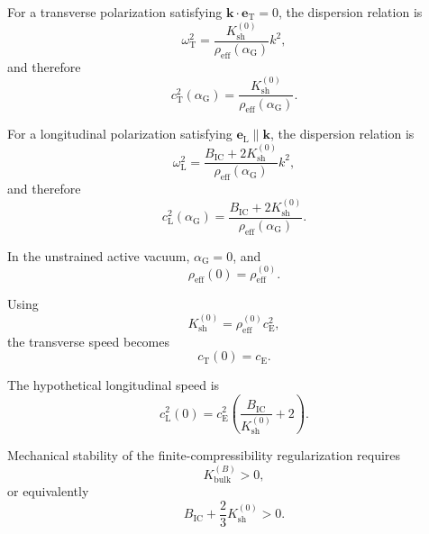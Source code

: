 For a transverse polarization satisfying $\mathbf{k}\cdot\mathbf{e}_{\mathrm{T}}=0$, the dispersion relation is
\begin{equation}
    \omega_{\mathrm{T}}^2 = \frac{K_{\mathrm{sh}}^{(0)}}{\rho_{\mathrm{eff}}(\alpha_{\mathrm{G}})}k^2,
\end{equation}
and therefore
\begin{equation}
    c_{\mathrm{T}}^2(\alpha_{\mathrm{G}}) = \frac{K_{\mathrm{sh}}^{(0)}}{\rho_{\mathrm{eff}}(\alpha_{\mathrm{G}})}.
\end{equation}

For a longitudinal polarization satisfying $\mathbf{e}_{\mathrm{L}}\parallel\mathbf{k}$, the dispersion relation is
\begin{equation}
    \omega_{\mathrm{L}}^2 = \frac{B_{\mathrm{IC}}+2K_{\mathrm{sh}}^{(0)}}{\rho_{\mathrm{eff}}(\alpha_{\mathrm{G}})}k^2,
\end{equation}
and therefore
\begin{equation}
    c_{\mathrm{L}}^2(\alpha_{\mathrm{G}}) = \frac{B_{\mathrm{IC}}+2K_{\mathrm{sh}}^{(0)}}{\rho_{\mathrm{eff}}(\alpha_{\mathrm{G}})}.
\end{equation}

In the unstrained active vacuum, $\alpha_{\mathrm{G}}=0$, and
\begin{equation}
    \rho_{\mathrm{eff}}(0) = \rho_{\mathrm{eff}}^{(0)}.
\end{equation}

Using
\begin{equation}
    K_{\mathrm{sh}}^{(0)} = \rho_{\mathrm{eff}}^{(0)}c_{\mathrm{E}}^2,
\end{equation}
the transverse speed becomes
\begin{equation}
    c_{\mathrm{T}}(0) = c_{\mathrm{E}}.
\end{equation}

The hypothetical longitudinal speed is
\begin{equation}
    c_{\mathrm{L}}^2(0) = c_{\mathrm{E}}^2\left(\frac{B_{\mathrm{IC}}}{K_{\mathrm{sh}}^{(0)}}+2\right).
\end{equation}

Mechanical stability of the finite-compressibility regularization requires
\begin{equation}
    K_{\mathrm{bulk}}^{(B)} > 0,
\end{equation}
or equivalently
\begin{equation}
    B_{\mathrm{IC}} + \frac{2}{3}K_{\mathrm{sh}}^{(0)} > 0.
\end{equation}

